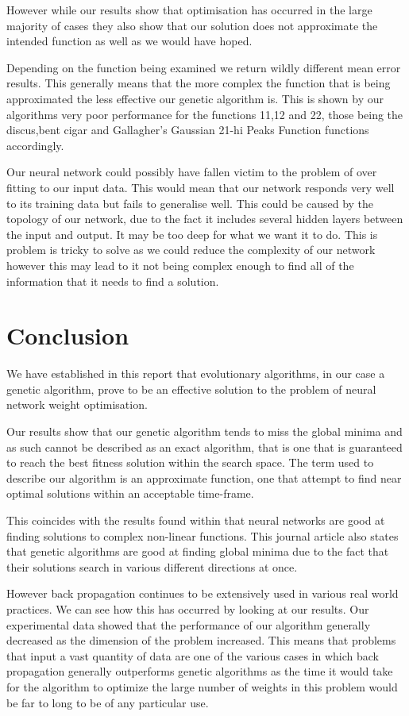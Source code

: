 \documentclass[12pt]{article}
\begin{document}
However while our results show that optimisation has occurred in the large majority of cases they also show that our solution does not approximate the intended function as well as we would have hoped.

Depending on the function being examined we return wildly different mean error results. This generally means that the more complex the function that is being approximated the less effective our genetic algorithm is. This is shown by our algorithms very poor performance for the functions 11,12 and 22, those being the discus,bent cigar and Gallagher's Gaussian 21-hi Peaks Function functions accordingly.

Our neural network could possibly have fallen victim to the problem of over fitting to our input data. This would mean that our network responds very well to its training data but fails to generalise well. This could be caused by the topology of our network, due to the fact it includes several hidden layers between the input and output. It may be too deep for what we want it to do. This is problem is tricky to solve as we could reduce the complexity of our network however this may lead to it not being complex enough to find all of the information that it needs to find a solution.


\newpage
\section{Conclusion}

We have established in this report that evolutionary algorithms, in our case a genetic algorithm, prove to be an effective solution to the problem of neural network weight optimisation. 

Our results show that our genetic algorithm tends to miss the global minima and as such cannot be described as an exact algorithm, that is one that is guaranteed to reach the best fitness solution within the search space. The term used to describe our algorithm is an approximate function, one that attempt to find near optimal solutions within an acceptable time-frame. 

This coincides with the results found within \cite{GlobalOpt} that neural networks are good at finding solutions to complex non-linear functions. This journal article also states that genetic algorithms are good at finding global minima due to the fact that their solutions search in various different directions at once.

However back propagation continues to be extensively used in various real world practices. We can see how this has occurred by looking at our results. Our experimental data showed that the performance of our algorithm generally decreased as the dimension of the problem increased. This means that problems that input a vast quantity of data are one of the various cases in which back propagation generally outperforms genetic algorithms as the time it would take for  the algorithm to optimize the large number of weights in this problem would be far to long to be of any particular use.
\end{document}

